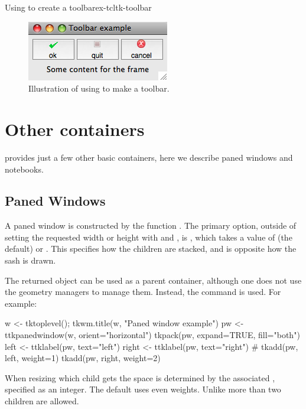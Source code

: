 \begin{example}{Using  to create a toolbar}{ex-tcltk-toolbar}
\begin{figure}
  \centering
  \includegraphics[width=.6\textwidth]{fig-tcltk-toolbar.png}
  \caption{Illustration of using  to make a toolbar. }
  \label{fig:fig-tcltk-toolbar}
\end{figure}

\end{example}


\section{Other containers}
\label{sec:tcltk:other-containers}
\TK\/ provides just a few other basic containers, here we describe paned windows and notebooks.

\subsection{Paned Windows}
\label{sec:tcltk:paned-windows}

A paned window  is constructed by the function . The primary option, outside of setting the requested width or height with  and , is , which takes a value of  (the default) or . This specifies how the children are stacked, and is opposite how the sash is drawn.

The returned object can be used as a parent container, although one does not use the geometry managers to manage them. Instead, the  command is used. For example:
\begin{Schunk}
\begin{Sinput}
 w <- tktoplevel(); tkwm.title(w, "Paned window example")
 pw <- ttkpanedwindow(w, orient="horizontal")
 tkpack(pw, expand=TRUE, fill="both")
 left <- ttklabel(pw, text="left")
 right <- ttklabel(pw, text="right")
 #
 tkadd(pw, left, weight=1)
 tkadd(pw, right, weight=2)
\end{Sinput}
\end{Schunk}
When resizing which child gets the space is determined by the
associated , specified as an integer. The default uses
even weights.  Unlike \GTK\/ more than two children are allowed.

